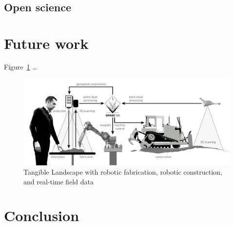 \documentclass[prodmode,acmtochi]{acmsmall} %
\begin{document}

\subsection{Open science}



\section{Future work}






Figure~\ref{fig:system_schema_land} \ldots 

\begin{figure}%
\begin{center}
\includegraphics[width=\textwidth]{images/system_schema_land.pdf}
\caption{Tangible Landscape with robotic fabrication, robotic construction, and real-time field data}
\label{fig:system_schema_land}
\end{center}
\end{figure}

\section{Conclusion}
\end{document}
